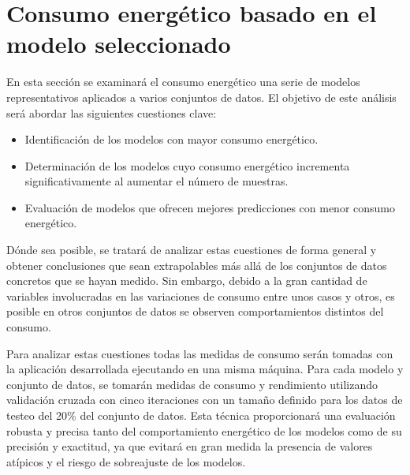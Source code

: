 \section{Consumo energético basado en el modelo seleccionado}
    

En esta sección se examinará el consumo energético una serie de modelos representativos aplicados a varios conjuntos de datos. El objetivo de este análisis será abordar las siguientes cuestiones clave:

\begin{itemize}
    \item Identificación de los modelos con mayor consumo energético.
    \item Determinación de los modelos cuyo consumo energético incrementa significativamente al aumentar el número de muestras.
    \item Evaluación de modelos que ofrecen mejores predicciones con menor consumo energético.
\end{itemize}

Dónde sea posible, se tratará de analizar estas cuestiones de forma general y obtener conclusiones que sean extrapolables más allá de los conjuntos de datos concretos que se hayan medido. Sin embargo, debido a la gran cantidad de variables involucradas en las variaciones de consumo entre unos casos y otros, es posible en otros conjuntos de datos se observen comportamientos distintos del consumo.

Para analizar estas cuestiones todas las medidas de consumo serán tomadas con la aplicación desarrollada ejecutando en una misma máquina. Para cada modelo y conjunto de datos, se tomarán medidas de consumo y rendimiento utilizando validación cruzada con cinco iteraciones con un tamaño definido para los datos de testeo del 20\% del conjunto de datos. Esta técnica proporcionará una evaluación robusta y precisa tanto del comportamiento energético de los modelos como de su precisión y exactitud, ya que evitará en gran medida la presencia de valores atípicos y el riesgo de sobreajuste de los modelos.

